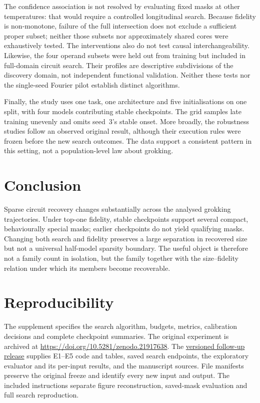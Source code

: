 The confidence association is not resolved by evaluating fixed masks at other temperatures: that would require a controlled longitudinal search. Because fidelity is non-monotone, failure of the full intersection does not exclude a sufficient proper subset; neither those subsets nor approximately shared cores were exhaustively tested. The interventions also do not test causal interchangeability. Likewise, the four operand subsets were held out from training but included in full-domain circuit search. Their profiles are descriptive subdivisions of the discovery domain, not independent functional validation. Neither these tests nor the single-seed Fourier pilot establish distinct algorithms.

Finally, the study uses one task, one architecture and five initialisations on one split, with four models contributing stable checkpoints. The grid samples late training unevenly and omits seed~3's stable onset. More broadly, the robustness studies follow an observed original result, although their execution rules were frozen before the new search outcomes. The data support a consistent pattern in this setting, not a population-level law about grokking.

\section{Conclusion}

Sparse circuit recovery changes substantially across the analysed grokking trajectories. Under top-one fidelity, stable checkpoints support several compact, behaviourally special masks; earlier checkpoints do not yield qualifying masks. Changing both search and fidelity preserves a large separation in recovered size but not a universal half-model sparsity boundary. The useful object is therefore not a family count in isolation, but the family together with the size--fidelity relation under which its members become recoverable.

\section*{Reproducibility}
The supplement specifies the search algorithm, budgets, metrics, calibration decisions and complete checkpoint summaries. The original experiment is archived at \url{https://doi.org/10.5281/zenodo.21917638}. The \href{https://github.com/AK-314/circuit-families/releases/tag/phase1-tmlr-review-followup-2026-09-13}{versioned follow-up release} supplies E1--E5 code and tables, saved search endpoints, the exploratory evaluator and its per-input results, and the manuscript sources. File manifests preserve the original freeze and identify every new input and output. The included instructions separate figure reconstruction, saved-mask evaluation and full search reproduction.

